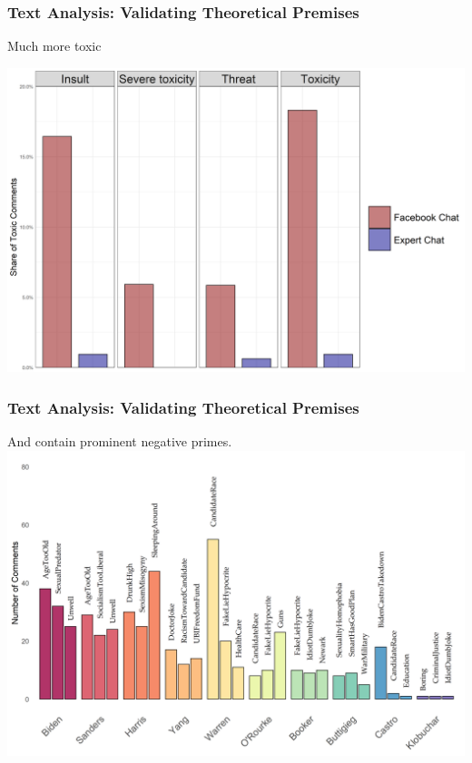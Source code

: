 \documentclass{beamer}
\begin{document}
\begin{frame}
\frametitle{Text Analysis: Validating Theoretical Premises}
\centering

Much more toxic

\includegraphics[width=1\linewidth]{proportion_toxicity.png}

\end{frame}



\begin{frame}
\frametitle{Text Analysis: Validating Theoretical Premises}
And contain prominent negative primes.
\includegraphics[width=1\linewidth]{topics_3by_cand.png}
\end{frame}
\end{document}
